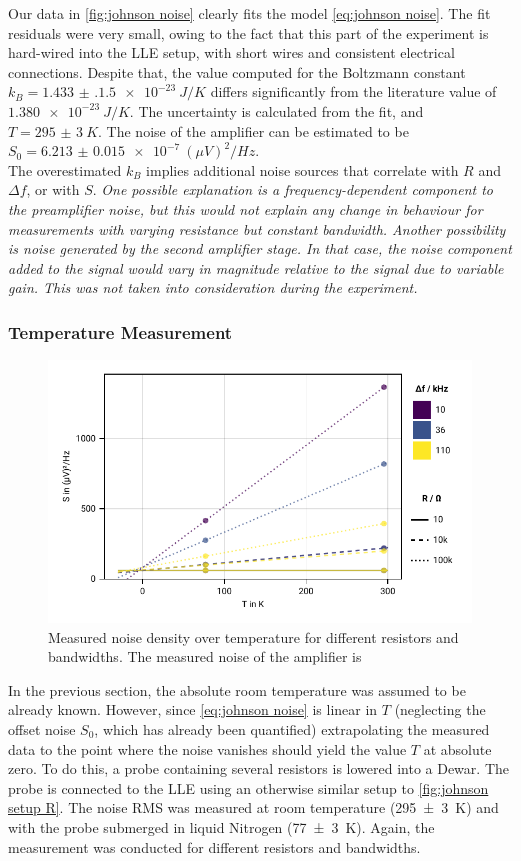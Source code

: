 \documentclass[
    parskip=half, 
    twoside=false,
    twocolumn=true,
    fontsize=11pt,
]{scrarticle}
\begin{document}
Our data in \autoref{fig:johnson noise} clearly fits the model \autoref{eq:johnson noise}. 
The fit residuals were very small, owing to the fact that this part of the experiment is hard-wired into the LLE setup, with short wires and consistent electrical connections.
Despite that, the value computed for the Boltzmann constant $k_B = \SI{1.433(1.5)e-23}{J/K}$ differs significantly from the literature value of $\SI{1.380e-23}{J/K}$. 
The uncertainty is calculated from the fit, and $T = \SI{295(3)}{K}$.
The noise of the amplifier can be estimated to be $S_0 = \SI{6.213(15)e-7}{(\mu V)^2/Hz}$.\\
The overestimated $k_B$ implies additional noise sources that correlate with $R$ and $\Delta f$, or with $S$.
\textit{
    One possible explanation is a frequency-dependent component to the preamplifier noise, but this would not explain any change in behaviour for measurements with varying resistance but constant bandwidth.
    Another possibility is noise generated by the second amplifier stage.
    In that case, the noise component added to the signal would vary in magnitude relative to the signal due to variable gain.
    This was not taken into consideration during the experiment.
}

\subsubsection*{Temperature Measurement}
\begin{figure}[h!]
    \centering
    \includegraphics{figures/02 temperature.pdf}
    \caption{
        Measured noise density over temperature for different resistors and bandwidths.
        The measured noise of the amplifier is 
    }
    \label{fig:johnson noise temperature}
\end{figure}
In the previous section, the absolute room temperature was assumed to be already known. 
However, since \autoref{eq:johnson noise} is linear in $T$ (neglecting the offset noise $S_0$, which has already been quantified) extrapolating the measured data to the point where the noise vanishes should yield the value $T$ at absolute zero. 
To do this, a probe containing several resistors is lowered into a Dewar. 
The probe is connected to the LLE using an otherwise similar setup to \autoref{fig:johnson setup R}. The noise RMS was measured at room temperature (\SI{295(3)}{K}) and with the probe submerged in liquid Nitrogen (\SI{77(3)}{K}). Again, the measurement was conducted for different resistors and bandwidths.
\end{document}
